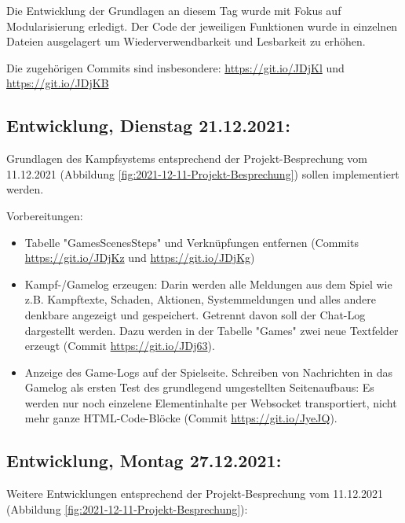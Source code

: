 Die Entwicklung der Grundlagen an diesem Tag wurde mit Fokus auf Modularisierung erledigt. Der Code der jeweiligen Funktionen wurde in einzelnen Dateien ausgelagert um Wiederverwendbarkeit und Lesbarkeit zu erhöhen. 

Die zugehörigen Commits sind insbesondere: 
\url{https://git.io/JDjKl} und 
\url{https://git.io/JDjKB}


\subsection{Entwicklung, Dienstag 21.12.2021:}

Grundlagen des Kampfsystems entsprechend der Projekt-Besprechung vom 11.12.2021 (Abbildung \ref{fig:2021-12-11-Projekt-Besprechung}) sollen implementiert werden.

Vorbereitungen: 

\begin{itemize}
    \item Tabelle "GamesScenesSteps" und Verknüpfungen entfernen (Commits \url{https://git.io/JDjKz} und \url{https://git.io/JDjKg})
    \item Kampf-/Gamelog erzeugen: Darin werden alle Meldungen aus dem Spiel wie z.B. Kampftexte, Schaden, Aktionen, Systemmeldungen und alles andere denkbare angezeigt und gespeichert. Getrennt davon soll der Chat-Log dargestellt werden. Dazu werden in der Tabelle "Games" zwei neue Textfelder erzeugt (Commit \url{https://git.io/JDj63}). 
    \item Anzeige des Game-Logs auf der Spielseite. Schreiben von Nachrichten in das Gamelog als ersten Test des grundlegend umgestellten Seitenaufbaus: Es werden nur noch einzelene Elementinhalte per Websocket transportiert, nicht mehr ganze HTML-Code-Blöcke (Commit \url{https://git.io/JyeJQ}).
\end{itemize}


\subsection{Entwicklung, Montag 27.12.2021:} \label{ref-runden-impl}

Weitere Entwicklungen entsprechend der Projekt-Besprechung vom 11.12.2021 (Abbildung \ref{fig:2021-12-11-Projekt-Besprechung}):

